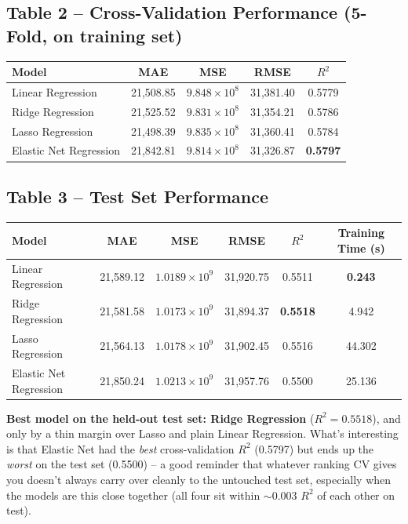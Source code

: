 \documentclass[12pt,a4paper]{article}
\begin{document}
\subsection*{Table 2 -- Cross-Validation Performance (5-Fold, on training set)}
{\small
\begin{tabular}{lcccc}
\toprule
Model & MAE & MSE & RMSE & $R^2$ \\
\midrule
Linear Regression & 21{,}508.85 & $9.848 \times 10^{8}$ & 31{,}381.40 & 0.5779 \\
Ridge Regression & 21{,}525.52 & $9.831 \times 10^{8}$ & 31{,}354.21 & 0.5786 \\
Lasso Regression & 21{,}498.39 & $9.835 \times 10^{8}$ & 31{,}360.41 & 0.5784 \\
Elastic Net Regression & 21{,}842.81 & $9.814 \times 10^{8}$ & 31{,}326.87 & \textbf{0.5797} \\
\bottomrule
\end{tabular}
}

\subsection*{Table 3 -- Test Set Performance}
{\small
\begin{tabular}{lccccc}
\toprule
Model & MAE & MSE & RMSE & $R^2$ & Training Time (s) \\
\midrule
Linear Regression & 21{,}589.12 & $1.0189 \times 10^{9}$ & 31{,}920.75 & 0.5511 & \textbf{0.243} \\
Ridge Regression & 21{,}581.58 & $1.0173 \times 10^{9}$ & 31{,}894.37 & \textbf{0.5518} & 4.942 \\
Lasso Regression & 21{,}564.13 & $1.0178 \times 10^{9}$ & 31{,}902.45 & 0.5516 & 44.302 \\
Elastic Net Regression & 21{,}850.24 & $1.0213 \times 10^{9}$ & 31{,}957.76 & 0.5500 & 25.136 \\
\bottomrule
\end{tabular}
}

\vspace{0.3cm}
\textbf{Best model on the held-out test set: Ridge Regression} ($R^2 = 0.5518$), and only by a thin margin over Lasso and plain Linear Regression. What's interesting is that Elastic Net had the \textit{best} cross-validation $R^2$ (0.5797) but ends up the \textit{worst} on the test set (0.5500) -- a good reminder that whatever ranking CV gives you doesn't always carry over cleanly to the untouched test set, especially when the models are this close together (all four sit within $\sim$0.003 $R^2$ of each other on test).
\end{document}

